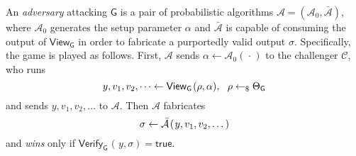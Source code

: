 \documentclass[psamsfonts, reqno]{amsart}
\theoremstyle{definition}
\theoremstyle{remark}
\numberwithin{equation}{section}
\begin{document}
\noindent
An \textit{adversary} attacking $\mathsf{G}$
is a pair of probabilistic algorithms
$\mathcal{A} = (\mathcal{A}_0, \mathcal{\bar{A}})$,
where $\mathcal{A}_0$ generates the setup parameter $\alpha$
and $\mathcal{\bar{A}}$ is capable of consuming the output
of $\mathsf{View}_\mathsf{G}$
in order to fabricate a purportedly valid output $\sigma$.
Specifically, the game is played as follows.
First, $\mathcal{A}$ sends
$
\alpha \leftarrow \mathcal{A}_0(\hspace{1pt}\cdot\hspace{1pt})
$
to the challenger $\mathcal{C}$, who runs
\vspace{5pt}
\begin{equation*}
y, v_1, v_2, \dots
\leftarrow \mathsf{View}_\mathsf{G}\hspace{1pt}(\rho, \alpha),
\ \ \rho \leftarrow_\$ \Theta_\mathsf{G}
\vspace{5pt}
\end{equation*}
and sends $y, v_1, v_2, \dots$ to $\mathcal{A}$.
Then $\mathcal{A}$ fabricates
\vspace{5pt}
\begin{equation*}
\sigma \leftarrow
\mathcal{\bar{A}}\hspace{1pt}(\hspace{1pt}y, v_1, v_2, \dots)
\vspace{5pt}
\end{equation*}
and \textit{wins} only if
$
\mathsf{Verify}_\mathsf{G}\hspace{1pt}(
	\hspace{1pt}y, \sigma
)
=
\mathsf{true}
$.
\end{document}
